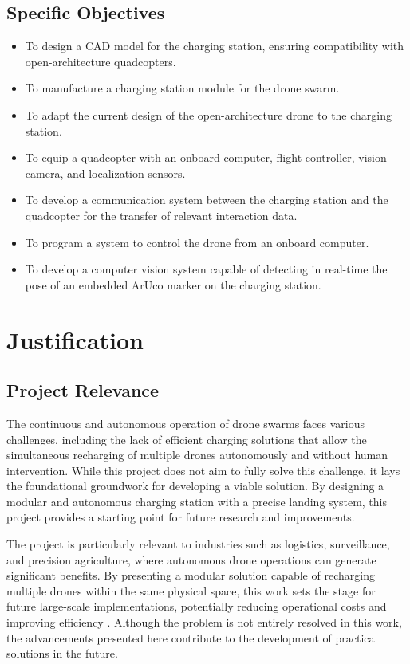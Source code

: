 \subsection{Specific Objectives}

\begin{itemize}
    \item To design a CAD model for the charging station, ensuring compatibility with open-architecture quadcopters.
    \item To manufacture a charging station module for the drone swarm.
    \item To adapt the current design of the open-architecture drone to the charging station.
    \item To equip a quadcopter with an onboard computer, flight controller, vision camera, and localization sensors.
    \item To develop a communication system between the charging station and the quadcopter for the transfer of relevant interaction data.
    \item To program a system to control the drone from an onboard computer.
    \item To develop a computer vision system capable of detecting in real-time the pose of an embedded ArUco marker on the charging station.
\end{itemize}

\section{Justification}

\subsection{Project Relevance}

The continuous and autonomous operation of drone swarms faces various challenges, including the lack of efficient charging solutions that allow the simultaneous recharging of multiple drones autonomously and without human intervention. While this project does not aim to fully solve this challenge, it lays the foundational groundwork for developing a viable solution. By designing a modular and autonomous charging station with a precise landing system, this project provides a starting point for future research and improvements.

The project is particularly relevant to industries such as logistics, surveillance, and precision agriculture, where autonomous drone operations can generate significant benefits. By presenting a modular solution capable of recharging multiple drones within the same physical space, this work sets the stage for future large-scale implementations, potentially reducing operational costs and improving efficiency \cite{cite1}. Although the problem is not entirely resolved in this work, the advancements presented here contribute to the development of practical solutions in the future.


